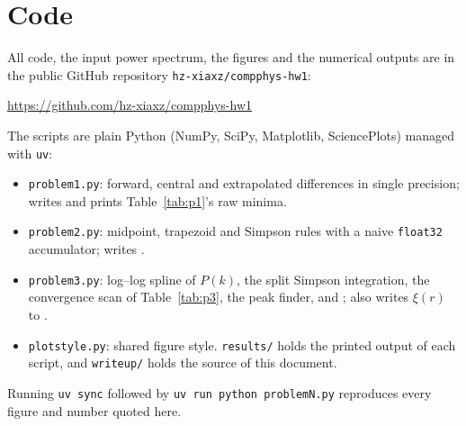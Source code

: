 \documentclass[11pt]{article}
\newcommand{\code}[1]{\texttt{#1}}
\begin{document}
\section*{Code}

All code, the input power spectrum, the figures and the numerical outputs are in
the public GitHub repository \code{hz-xiaxz/compphys-hw1}:
\begin{center}
\url{https://github.com/hz-xiaxz/compphys-hw1}
\end{center}
The scripts are plain Python (NumPy, SciPy, Matplotlib, SciencePlots) managed
with \code{uv}:
\begin{itemize}
\item \code{problem1.py}: forward, central and extrapolated differences in
single precision; writes  and prints
Table~\ref{tab:p1}'s raw minima.
\item \code{problem2.py}: midpoint, trapezoid and Simpson rules with a naive
\code{float32} accumulator; writes .
\item \code{problem3.py}: log--log spline of $P(k)$, the split Simpson
integration, the convergence scan of Table~\ref{tab:p3}, the peak finder, and
; also writes $\xi(r)$ to
.
\item \code{plotstyle.py}: shared figure style. \code{results/} holds the
printed output of each script, and \code{writeup/} holds the source of this
document.
\end{itemize}
Running \code{uv sync} followed by \code{uv run python problemN.py} reproduces
every figure and number quoted here.
\end{document}
